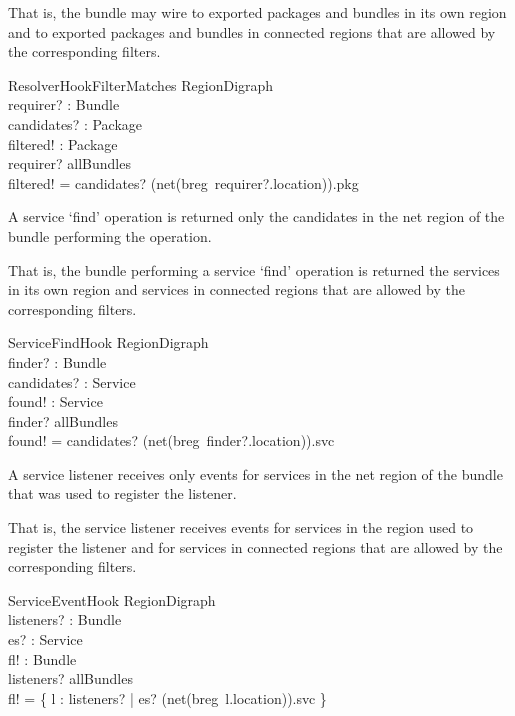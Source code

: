\documentclass[a4paper,9pt]{article}
\begin{document}
That is, the bundle may wire to exported packages and bundles in its own region and to
exported packages and bundles in connected regions that are allowed by the corresponding filters.
\begin{schema}{ResolverHookFilterMatches}
  \Xi RegionDigraph \\
  requirer? : Bundle \\
  candidates? : \power Package \\
  filtered! : \power Package \\
\where
  requirer? \in allBundles \\
  filtered! = candidates? \cap (net(breg~requirer?.location)).pkg \\
\end{schema}

A service `find' operation is returned only the
candidates in the net region of the bundle performing the operation.

That is, the bundle performing a service `find' operation is returned the services in its own region
and services in connected regions that are allowed by the corresponding filters.
\begin{schema}{ServiceFindHook}
  \Xi RegionDigraph \\
  finder? : Bundle \\
  candidates? : \power Service \\
  found! : \power Service \\
\where
  finder? \in allBundles \\
  found! = candidates? \cap (net(breg~finder?.location)).svc \\
\end{schema}

A service listener receives only events for services in the net region of the bundle that was used
to register the listener.

That is, the service listener receives events for services in the region used to register the listener
and for services in connected regions that are allowed by the corresponding filters.
\begin{schema}{ServiceEventHook}
  \Xi RegionDigraph \\
  listeners? : \power Bundle \\
  es? : Service \\
  fl! : \power Bundle \\
\where
  listeners? \subseteq allBundles \\
  fl! = \{ l : listeners? | es? \in (net(breg~l.location)).svc \} \\
\end{schema}
\end{document}

